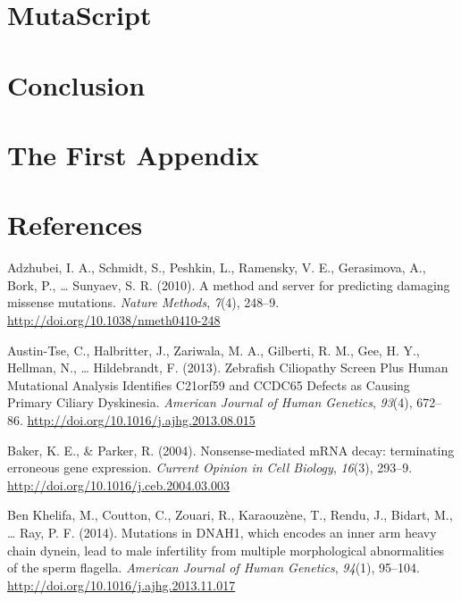 \documentclass[12pt,twoside]{reedthesis}
\theoremstyle{definition}
\theoremstyle{definition}
\theoremstyle{remark}
\begin{document}
  \newpage  
  
  \chapter{MutaScript}\label{mutascript}
  
  \chapter*{Conclusion}\label{conclusion-1}
  
  \chapter{The First Appendix}\label{the-first-appendix}
  
  \chapter*{References}\label{references}
  
  \hypertarget{refs}{}
  \hypertarget{ref-Adzhubei2010}{}
  Adzhubei, I. A., Schmidt, S., Peshkin, L., Ramensky, V. E., Gerasimova,
  A., Bork, P., \ldots{} Sunyaev, S. R. (2010). A method and server for
  predicting damaging missense mutations. \emph{Nature Methods},
  \emph{7}(4), 248--9. \url{http://doi.org/10.1038/nmeth0410-248}
  
  \hypertarget{ref-Austin-Tse2013}{}
  Austin-Tse, C., Halbritter, J., Zariwala, M. A., Gilberti, R. M., Gee,
  H. Y., Hellman, N., \ldots{} Hildebrandt, F. (2013). Zebrafish
  Ciliopathy Screen Plus Human Mutational Analysis Identifies C21orf59 and
  CCDC65 Defects as Causing Primary Ciliary Dyskinesia. \emph{American
  Journal of Human Genetics}, \emph{93}(4), 672--86.
  \url{http://doi.org/10.1016/j.ajhg.2013.08.015}
  
  \hypertarget{ref-Baker2004}{}
  Baker, K. E., \& Parker, R. (2004). Nonsense-mediated mRNA decay:
  terminating erroneous gene expression. \emph{Current Opinion in Cell
  Biology}, \emph{16}(3), 293--9.
  \url{http://doi.org/10.1016/j.ceb.2004.03.003}
  
  \hypertarget{ref-BenKhelifa2014}{}
  Ben Khelifa, M., Coutton, C., Zouari, R., Karaouzène, T., Rendu, J.,
  Bidart, M., \ldots{} Ray, P. F. (2014). Mutations in DNAH1, which
  encodes an inner arm heavy chain dynein, lead to male infertility from
  multiple morphological abnormalities of the sperm flagella.
  \emph{American Journal of Human Genetics}, \emph{94}(1), 95--104.
  \url{http://doi.org/10.1016/j.ajhg.2013.11.017}
  
\end{document}
